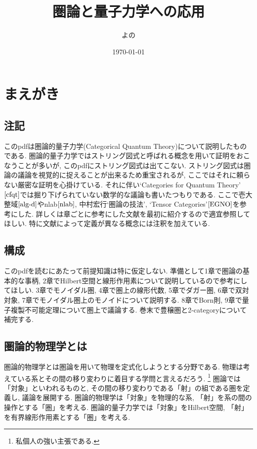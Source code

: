 \documentclass[a4paper,12pt]{ltjsarticle}
\title{圏論と量子力学への応用}
\author{よの}
\date{\today}
\theoremstyle{break}
\numberwithin{equation}{section}
\begin{document}
\maketitle

\newpage

\section*{まえがき}

\subsection*{注記}

このpdfは圏論的量子力学(Categorical Quantum Theory)について説明したものである. 
圏論的量子力学ではストリング図式と呼ばれる概念を用いて証明をおこなうことが多いが, このpdfにストリング図式は出てこない. 
ストリング図式は圏論の議論を視覚的に捉えることが出来るため重宝されるが, ここではそれに頼らない厳密な証明を心掛けている.  
それに伴い`Categories for Quantum Theory'$\cite{cfqt}$では掘り下げられていない数学的な議論も書いたつもりである. 
ここで壱大整域$\cite{alg-d}$やnlab$\cite{nlab}$, 中村宏行`圏論の技法'\cite{gihou}, `Tensor Categories'$\cite{EGNO}$を参考にした. 
詳しくは章ごとに参考にした文献を最初に紹介するので適宜参照してほしい. 
特に文献によって定義が異なる概念には注釈を加えている. 

\subsection*{構成}

このpdfを読むにあたって前提知識は特に仮定しない. 
準備として1章で圏論の基本的な事柄, 2章でHilbert空間と線形作用素について説明しているので参考にしてほしい.  
3章でモノイダル圏, 4章で圏上の線形代数, 5章でダガー圏, 6章で双対対象, 7章でモノイダル圏上のモノイドについて説明する. 
8章でBorn則, 9章で量子複製不可能定理について圏上で議論する. 
巻末で豊穣圏と2-categoryについて補完する. 

\subsection*{圏論的物理学とは}

圏論的物理学とは圏論を用いて物理を定式化しようとする分野である. 
物理は考えている系とその間の移り変わりに着目する学問と言えるだろう.
\footnote{
  私個人の強い主張である. 
}
圏論では「対象」といわれるものと, その間の移り変わりである「射」の組である圏を定義し, 議論を展開する. 
圏論的物理学は「対象」を物理的な系, 「射」を系の間の操作とする「圏」を考える. 
圏論的量子力学では「対象」をHilbert空間, 「射」を有界線形作用素とする「圏」を考える. 
\end{document}

